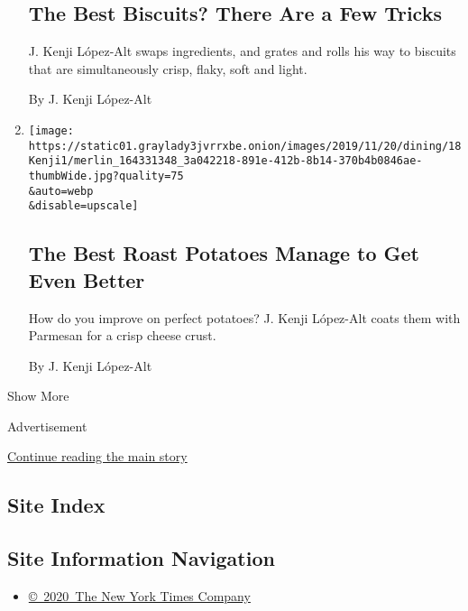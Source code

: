 \begin{enumerate}
  \hypertarget{the-best-biscuits-there-are-a-few-tricks}{%
  \subsection{The Best Biscuits? There Are a Few
  Tricks}\label{the-best-biscuits-there-are-a-few-tricks}}

  J. Kenji López-Alt swaps ingredients, and grates and rolls his way to
  biscuits that are simultaneously crisp, flaky, soft and light.

  By J. Kenji López-Alt
\item
  \href{/2019/11/18/dining/kenji-best-roast-potatoes.html}{}

  \texttt{[image: https://static01.graylady3jvrrxbe.onion/images/2019/11/20/dining/18Kenji1/merlin\_164331348\_3a042218-891e-412b-8b14-370b4b0846ae-thumbWide.jpg?quality=75\\\&auto=webp\\\&disable=upscale]}

  \hypertarget{the-best-roast-potatoes-manage-to-get-even-better}{%
  \subsection{The Best Roast Potatoes Manage to Get Even
  Better}\label{the-best-roast-potatoes-manage-to-get-even-better}}

  How do you improve on perfect potatoes? J. Kenji López-Alt coats them
  with Parmesan for a crisp cheese crust.

  By J. Kenji López-Alt
\end{enumerate}

Show More

Advertisement

\protect\hyperlink{after-mid2}{Continue reading the main story}

\hypertarget{site-index}{%
\subsection{Site Index}\label{site-index}}

\hypertarget{site-information-navigation}{%
\subsection{Site Information
Navigation}\label{site-information-navigation}}

\begin{itemize}
\tightlist
\item
  \href{https://help.nytimes3xbfgragh.onion/hc/en-us/articles/115014792127-Copyright-notice}{©~2020~The
  New York Times Company}
\end{itemize}

